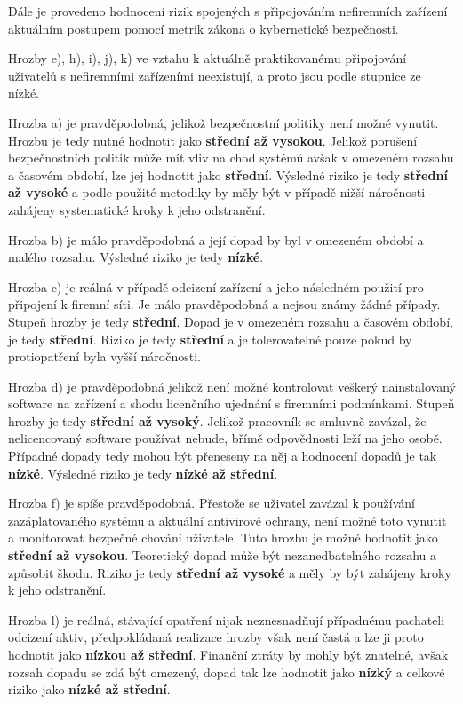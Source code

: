 Dále je provedeno hodnocení rizik spojených s připojováním nefiremních zařízení aktuálním postupem pomocí metrik zákona o kybernetické bezpečnosti.

Hrozby e), h), i), j), k) ve vztahu k aktuálně praktikovanému připojování uživatelů s nefiremními zařízeními neexistují, a proto jsou podle stupnice ze \cite{Zakon1} nízké.

Hrozba a) je pravděpodobná, jelikož bezpečnostní politiky není možné vynutit. Hrozbu je tedy nutné hodnotit jako \textbf{střední až vysokou}. Jelikož porušení bezpečnostních politik může mít vliv na chod systémů avšak v omezeném rozsahu a časovém období, lze jej hodnotit jako \textbf{střední}. Výsledné riziko je tedy \textbf{střední až vysoké} a podle použité metodiky by měly být v případě nižší náročnosti zahájeny systematické kroky k jeho odstranění.

Hrozba b) je málo pravděpodobná a její dopad by byl v omezeném období a malého rozsahu. Výsledné riziko je tedy \textbf{nízké}.

Hrozba c) je reálná v případě odcizení zařízení a jeho následném použití pro připojení k firemní síti. Je málo pravděpodobná a nejsou známy žádné případy. Stupeň hrozby je tedy \textbf{střední}. Dopad je v omezeném rozsahu a časovém období, je tedy \textbf{střední}. Riziko je tedy \textbf{střední} a je tolerovatelné pouze pokud by protiopatření byla vyšší náročnosti.

Hrozba d) je pravděpodobná jelikož není možné kontrolovat veškerý nainstalovaný software na zařízení a shodu licenčního ujednání s firemními podmínkami. Stupeň hrozby je tedy \textbf{střední až vysoký}. Jelikož pracovník se smluvně zavázal, že nelicencovaný software používat nebude, břímě odpovědnosti leží na jeho osobě. Případné dopady tedy mohou být přeneseny na něj a hodnocení dopadů je tak \textbf{nízké}. Výsledné riziko je tedy \textbf{nízké až střední}.

Hrozba f) je spíše pravděpodobná. Přestože se uživatel zavázal k používání zazáplatovaného systému a aktuální antivirové ochrany, není možné toto vynutit a monitorovat bezpečné chování uživatele. Tuto hrozbu je možné hodnotit jako \textbf{střední až vysokou}. Teoretický dopad může být nezanedbatelného rozsahu a způsobit škodu. Riziko je tedy \textbf{střední až vysoké} a měly by být zahájeny kroky k jeho odstranění.

Hrozba l) je reálná, stávající opatření nijak neznesnadňují případnému pachateli odcizení aktiv, předpokládaná realizace hrozby však není častá a lze ji proto hodnotit jako \textbf{nízkou až střední}. Finanční ztráty by mohly být znatelné, avšak rozsah dopadu se zdá být omezený, dopad tak lze hodnotit jako \textbf{nízký} a celkové riziko jako \textbf{nízké až střední}.


